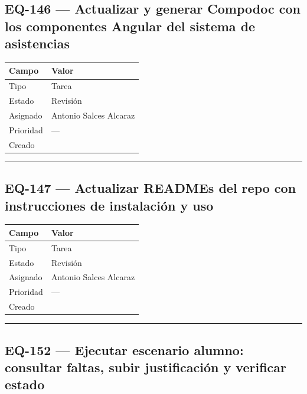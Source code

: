 \documentclass[
  spanish,
  11pt,
]{report}
\newcounter{none} %
\begin{document}
\subsection{EQ-146 --- Actualizar y generar Compodoc con los componentes
Angular del sistema de
asistencias}\label{eq-146-actualizar-y-generar-compodoc-con-los-componentes-angular-del-sistema-de-asistencias}

{\def\LTcaptype{none} %
\begin{longtable}[]{@{}ll@{}}
\toprule\noalign{}
Campo & Valor \\
\midrule\noalign{}
\endhead
\bottomrule\noalign{}
\endlastfoot
Tipo & Tarea \\
Estado & Revisión \\
Asignado & Antonio Salces Alcaraz \\
Prioridad & --- \\
Creado & \\
\end{longtable}
}

\begin{center}\rule{0.5\linewidth}{0.5pt}\end{center}

\subsection{EQ-147 --- Actualizar READMEs del repo con instrucciones de
instalación y
uso}\label{eq-147-actualizar-readmes-del-repo-con-instrucciones-de-instalaciuxf3n-y-uso}

{\def\LTcaptype{none} %
\begin{longtable}[]{@{}ll@{}}
\toprule\noalign{}
Campo & Valor \\
\midrule\noalign{}
\endhead
\bottomrule\noalign{}
\endlastfoot
Tipo & Tarea \\
Estado & Revisión \\
Asignado & Antonio Salces Alcaraz \\
Prioridad & --- \\
Creado & \\
\end{longtable}
}

\begin{center}\rule{0.5\linewidth}{0.5pt}\end{center}

\subsection{EQ-152 --- Ejecutar escenario alumno: consultar faltas,
subir justificación y verificar
estado}\label{eq-152-ejecutar-escenario-alumno-consultar-faltas-subir-justificaciuxf3n-y-verificar-estado}
\end{document}
